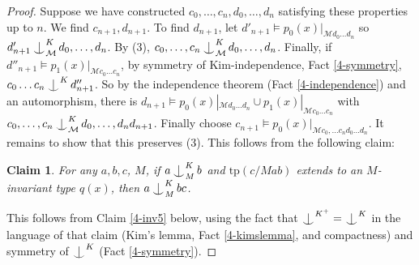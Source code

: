 \documentclass[12pt]{amsart}
\newtheorem{claim}[theorem]{Claim}
\theoremstyle{definition}
\def\Ind#1#2{#1\setbox0=\hbox{$#1x$}\kern\wd0\hbox to 0pt{\hss$#1\mid$\hss}
\lower.9\ht0\hbox to 0pt{\hss$#1\smile$\hss}\kern\wd0}
\def\ind{\mathop{\mathpalette\Ind{}}}
\begin{document}
\begin{proof}
Suppose we have constructed $c_{0}, \ldots, c_{n}, d_{0}, \ldots, d_{n}$ satisfying these properties up to $n$. We find $c_{n+1}, d_{n+1}$. To find $d_{n+1}$, let $d'_{n+1} \models p_{0}(x)|_{\mathcal{M}d_{0}\ldots d_{n}}$ so $d'_{n+1} \ind^{K}_{\mathcal{M}}d_{0}, \ldots, d_{n}$. By (3), $c_{0}, \ldots, c_{n}\ind_{\mathcal{M}}^{K} d_{0}, \ldots, d_{n}$. Finally, if $d''_{n+1} \models p_{1}(x)|_{\mathcal{M}c_{0}\ldots c_{n}}$, by symmetry of Kim-independence, Fact \ref{4-symmetry}, $c_{0} \ldots c_{n} \ind^{K} d''_{n+1}$. So by the independence theorem (Fact \ref{4-independence}) and an automorphism, there is $d_{n+1} \models  p_{0}(x)|_{\mathcal{M}d_{0} \ldots d_{n}} \cup p_{1}(x)|_{\mathcal{M}c_{0}\ldots c_{n}}$ with $c_{0}, \ldots, c_{n} \ind_{\mathcal{M}}^{K} d_{0}, \ldots, d_{n} d_{n+1}$. Finally choose $c_{n+1} \models p_{0}(x)|_{\mathcal{M}c_{0}, \ldots c_{n} d_{0} \ldots d_{n}} $. It remains to show that this preserves (3). This follows from the following claim:

\begin{claim}
For any $a, b, c$, $M$, if $a \ind^{K}_{M} b$ and $\mathrm{tp}(c/Mab)$ extends to an $M$-invariant type $q(x)$, then $a \ind^{K}_{M} bc$.
\end{claim}

This follows from Claim \ref{4-inv5} below, using the fact that $\ind^{K^{+}} = \ind^{K}$ in the language of that claim (Kim's lemma, Fact \ref{4-kimslemma}, and compactness) and symmetry of $\ind^{K}$ (Fact \ref{4-symmetry}).

\end{proof}
\end{document}
